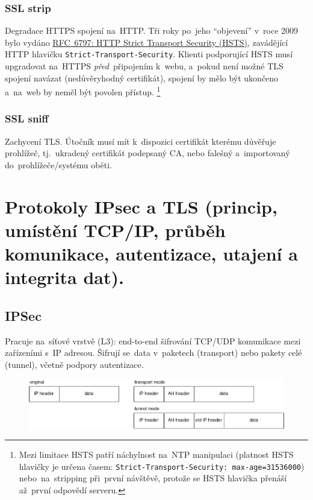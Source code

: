 \subsubsection{SSL strip}

Degradace HTTPS spojení na~HTTP. Tři roky po~jeho \enquote{objevení} v~roce 2009 bylo vydáno \href{https://datatracker.ietf.org/doc/html/rfc6797}{RFC~6797: HTTP Strict Transport Security (HSTS)}, zavádějící HTTP hlavičku \texttt{Strict-Transport-Security}. Klienti podporující HSTS musí upgradovat na~HTTPS \emph{před}~připojením k~webu, a~pokud není možné TLS spojení navázat (nedůvěryhodný certifikát), spojení by mělo být ukončeno a~na~web by neměl být povolen přístup.%
\footnote{Mezi limitace HSTS patří náchylnost na~NTP manipulaci (platnost HSTS hlavičky je určena časem: \texttt{Strict-Transport-Security: max-age=31536000}) nebo~na~stripping při~první návštěvě, protože se HSTS hlavička přenáší až~první odpovědí serveru.}

\subsubsection{SSL sniff}

Zachycení TLS. Útočník musí mít k~dispozici certifikát kterému důvěřuje prohlížeč, tj.~ukradený certifikát podepsaný CA, nebo falešný a~importovaný do~prohlížeče/systému oběti.

\clearpage
\section{Protokoly IPsec a TLS (princip, umístění TCP/IP, průběh komunikace, autentizace, utajení a integrita dat).}

\subsection{IPSec}

Pracuje na~síťové vrstvě (L3): end-to-end šifrování TCP/UDP komunikace mezi zařízeními s~IP adresou. Šifrují se~data v~paketech (transport) nebo pakety celé (tunnel), včetně podpory autentizace.

\begin{figure}[ht]
\centering
\includegraphics[width=\textwidth]{images/ipsec}
\end{figure}

